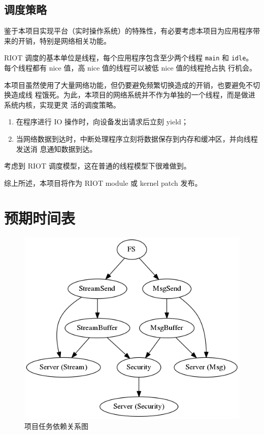 \documentclass{ctexart}
\begin{document}
\subsection{调度策略}
鉴于本项目实现平台（实时操作系统）的特殊性，有必要考虑本项目为应用程序带来的开销，特别是网络相关功能。

RIOT 调度的基本单位是线程，每个应用程序包含至少两个线程 \verb|main| 和
\verb|idle|。每个线程都有 nice 值，高 nice 值的线程可以被低 nice 值的线程抢占执
行机会。

本项目虽然使用了大量网络功能，但仍要避免频繁切换造成的开销，也要避免不切换造成线
程饿死。为此，本项目的网络系统并不作为单独的一个线程，而是做进系统内核，实现更灵
活的调度策略。
\begin{enumerate}
\item 在程序进行 IO 操作时，向设备发出请求后立刻 yield；
\item 当网络数据到达时，中断处理程序立刻将数据保存到内存和缓冲区，并向线程发送消
  息通知数据到达。
\end{enumerate}
考虑到 RIOT 调度模型，这在普通的线程模型下很难做到。

综上所述，本项目将作为 RIOT module 或 kernel patch 发布。


\section{预期时间表}

\begin{figure}
	\centering
	\includegraphics[scale=0.7]{dependency.png}
	\caption{项目任务依赖关系图}
	\label{fig-dep}
\end{figure}
\end{document}

